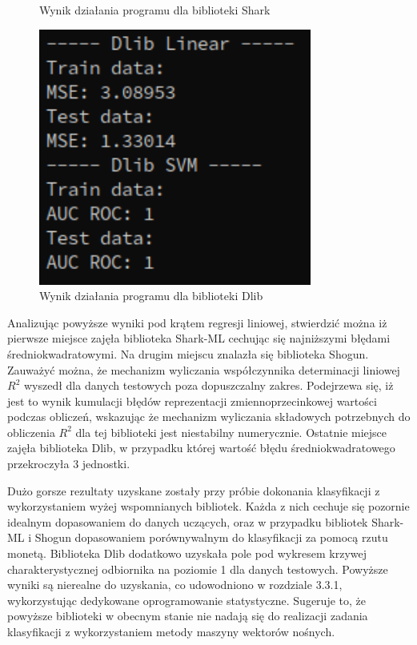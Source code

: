 \begin{figure}[!ht]
\begin{minipage}{0.31\textwidth}
		\caption{Wynik działania programu dla biblioteki Shark}
		\label{fig:shark_linear_svm}		
	\end{minipage}%
	\hspace{0.02\textwidth}
	\begin{minipage}{0.31\textwidth}
		\centering
		\includegraphics[width=0.8\textwidth]{Rysunki/Rozdzial7/dlib}
		\caption{Wynik działania programu dla biblioteki Dlib}
		\label{fig:dlib_linear_svm}
	\end{minipage}
\end{figure}

Analizując powyższe wyniki pod krątem regresji liniowej, stwierdzić można iż pierwsze miejsce zajęła biblioteka Shark-ML cechując się najniższymi błędami średniokwadratowymi. Na drugim miejscu znalazła się biblioteka Shogun. Zauważyć można, że mechanizm wyliczania współczynnika determinacji liniowej $R^2$ wyszedł dla danych testowych poza dopuszczalny zakres. Podejrzewa się, iż jest to wynik kumulacji błędów reprezentacji zmiennoprzecinkowej wartości podczas obliczeń, wskazując że mechanizm wyliczania składowych potrzebnych do obliczenia $R^2$ dla tej biblioteki jest niestabilny numerycznie. Ostatnie miejsce zajęła biblioteka Dlib, w przypadku której wartość błędu średniokwadratowego przekroczyła 3 jednostki.

Dużo gorsze rezultaty uzyskane zostały przy próbie dokonania klasyfikacji z wykorzystaniem wyżej wspomnianych bibliotek. Każda z nich cechuje się pozornie idealnym dopasowaniem do danych uczących, oraz w przypadku bibliotek Shark-ML i Shogun dopasowaniem porównywalnym do klasyfikacji za pomocą rzutu monetą. Biblioteka Dlib dodatkowo uzyskała pole pod wykresem krzywej charakterystycznej odbiornika na poziomie 1 dla danych testowych. Powyższe wyniki są nierealne do uzyskania, co udowodniono w rozdziale 3.3.1, wykorzystując dedykowane oprogramowanie statystyczne. Sugeruje to, że powyższe biblioteki w obecnym stanie nie nadają się do realizacji zadania klasyfikacji z wykorzystaniem metody maszyny wektorów nośnych. 


